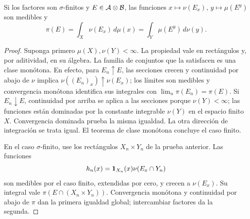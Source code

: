 \begin{lema}\label{lema:v2-cavalieri}
Si los factores son $\sigma$-finitos y $E\in\mathcal A\otimes\mathcal B$, las funciones $x\mapsto\nu(E_x)$, $y\mapsto\mu(E^y)$ son medibles y
\[\pi(E)=\int_X\nu(E_x)\,d\mu(x)=\int_Y\mu(E^y)\,d\nu(y).\]
\end{lema}
\begin{proof}
Suponga primero $\mu(X),\nu(Y)<\infty$. La propiedad vale en rectángulos y, por aditividad, en su álgebra. La familia de conjuntos que la satisfacen es una clase monótona. En efecto, para $E_n\uparrow E$, las secciones crecen y continuidad por abajo de $\nu$ implica $\nu((E_n)_x)\uparrow\nu(E_x)$; los límites son medibles y convergencia monótona identifica sus integrales con $\lim_n\pi(E_n)=\pi(E)$. Si $E_n\downarrow E$, continuidad por arriba se aplica a las secciones porque $\nu(Y)<\infty$; las funciones están dominadas por la constante integrable $\nu(Y)$ en el espacio finito $X$. Convergencia dominada prueba la misma igualdad. La otra dirección de integración se trata igual. El teorema de clase monótona concluye el caso finito.

En el caso $\sigma$-finito, use los rectángulos $X_n\times Y_n$ de la prueba anterior. Las funciones
\[h_n(x)=\mathbf1_{X_n}(x)\nu(E_x\cap Y_n)\]
son medibles por el caso finito, extendidas por cero, y crecen a $\nu(E_x)$. Su integral vale $\pi(E\cap(X_n\times Y_n))$. Convergencia monótona y continuidad por abajo de $\pi$ dan la primera igualdad global; intercambiar factores da la segunda.
\end{proof}

